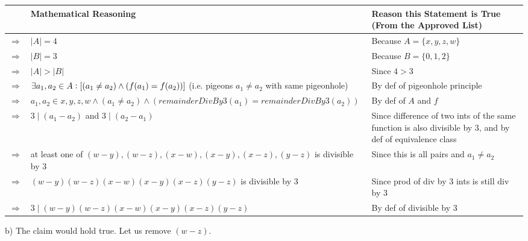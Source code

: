 \documentclass{article}
\begin{document}
\begin{flushleft} 
	\begin{tabular}{|p{0.5cm}|p{6.6cm}|p{5.5cm}|}
        \hline
        & \textbf{Mathematical Reasoning} & \textbf{Reason this Statement is True (From the Approved List)} \\
        \hline
        $\Rightarrow$ & $|A| = 4$ & Because $A=\{x,y,z,w\}$ \\
        \hline
        $\Rightarrow$ & $|B| = 3$ & Because $B=\{0,1,2\}$ \\
        \hline
        $\Rightarrow$ & $|A|>|B|$ & Since $4>3$ \\ 
        \hline
        $\Rightarrow$ & $\exists a_1,a_2\in A\vcentcolon [(a_1\neq a_2)\land (f(a_1)=f(a_2))]$ (i.e. pigeons $a_1\neq a_2$ with same pigeonhole) & By def of pigeonhole principle \\
        \hline
        $\Rightarrow$ & $a_1,a_2\in{x,y,z,w}\land(a_1\neq a_2)\land(remainderDivBy3(a_1)=remainderDivBy3(a_2))$ & By def of $A$ and $f$ \\
        \hline
        $\Rightarrow$ & $3\mid (a_1-a_2)$ and $3\mid (a_2-a_1)$ & Since difference of two ints of the same function is also divisible by 3, and by def of equivalence class\\
        \hline
        $\Rightarrow$ & at least one of $(w-y),(w-z),(x-w),(x-y),(x-z),(y-z)$ is divisible by 3 & Since this is all pairs and $a_1\neq a_2$\\
        \hline
        $\Rightarrow$ & $(w-y)(w-z)(x-w)(x-y)(x-z)(y-z)$ is divisible by 3 & Since prod of div by 3 ints is still div by 3\\
        \hline
        $\Rightarrow$ & $3\mid (w-y)(w-z)(x-w)(x-y)(x-z)(y-z)$ & By def of divisible by 3 \\
        \hline
	\end{tabular}
\end{flushleft}\vspace{10pt}


b)  The claim would hold true.  Let us remove $(w-z)$.\vspace{10pt}
\end{document}
